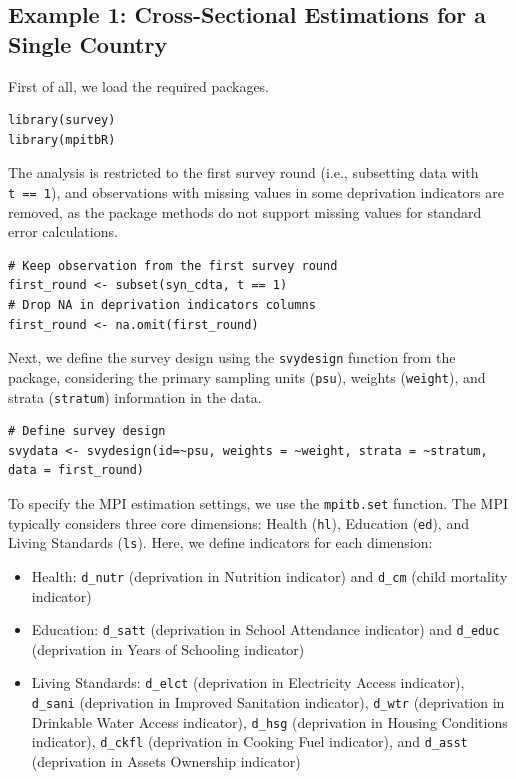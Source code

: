 \subsection{Example 1: Cross-Sectional Estimations for a Single Country}\label{example-1-cross-sectional-estimations-for-a-single-country}

First of all, we load the required packages.

\begin{verbatim}
library(survey) 
library(mpitbR)
\end{verbatim}

The analysis is restricted to the first survey round (i.e., subsetting data with \texttt{t\ ==\ 1}), and observations with missing values in some deprivation indicators are removed, as the  package methods do not support missing values for standard error calculations.

\begin{verbatim}
# Keep observation from the first survey round
first_round <- subset(syn_cdta, t == 1)
# Drop NA in deprivation indicators columns
first_round <- na.omit(first_round)
\end{verbatim}

Next, we define the survey design using the \texttt{svydesign} function from the  package, considering the primary sampling units (\texttt{psu}), weights (\texttt{weight}), and strata (\texttt{stratum}) information in the data.

\begin{verbatim}
# Define survey design
svydata <- svydesign(id=~psu, weights = ~weight, strata = ~stratum, data = first_round)
\end{verbatim}

To specify the MPI estimation settings, we use the \texttt{mpitb.set} function. The MPI typically considers three core dimensions: Health (\texttt{hl}), Education (\texttt{ed}), and Living Standards (\texttt{ls}). Here, we define indicators for each dimension:

\begin{itemize}
\item
  Health: \texttt{d\_nutr} (deprivation in Nutrition indicator) and \texttt{d\_cm} (child mortality indicator)
\item
  Education: \texttt{d\_satt} (deprivation in School Attendance indicator) and \texttt{d\_educ} (deprivation in Years of Schooling indicator)
\item
  Living Standards: \texttt{d\_elct} (deprivation in Electricity Access indicator), \texttt{d\_sani} (deprivation in Improved Sanitation indicator), \texttt{d\_wtr} (deprivation in Drinkable Water Access indicator), \texttt{d\_hsg} (deprivation in Housing Conditions indicator), \texttt{d\_ckfl} (deprivation in Cooking Fuel indicator), and \texttt{d\_asst} (deprivation in Assets Ownership indicator)
\end{itemize}


